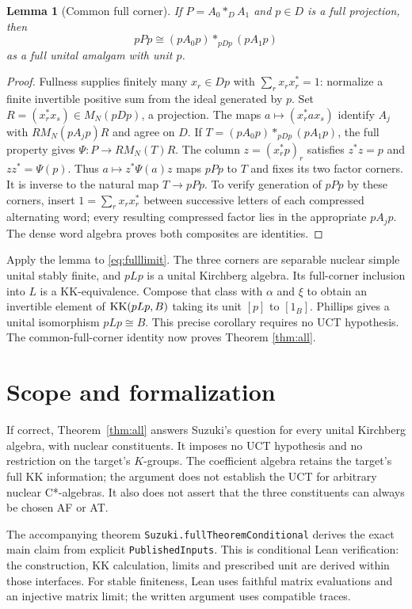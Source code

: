 \documentclass[11pt,letterpaper]{amsart}
\newtheorem{lemma}[theorem]{Lemma}
\theoremstyle{remark}\newtheorem{remark}[theorem]{Remark}
\begin{document}
\begin{lemma}[Common full corner]\label{lem:corner}
If $P=A_0*_D A_1$ and $p\in D$ is a full projection, then
\[
                    pPp\cong(pA_0p)*_{pDp}(pA_1p)
\]
as a full unital amalgam with unit $p$.
\end{lemma}
\begin{proof}
Fullness supplies finitely many $x_r\in Dp$ with
$\sum_rx_rx_r^*=1$: normalize a finite invertible positive sum from the
ideal generated by $p$. Set $R=(x_r^*x_s)\in M_N(pDp)$, a projection.
The maps $a\mapsto(x_r^*ax_s)$ identify $A_j$ with
$RM_N(pA_jp)R$ and agree on $D$. If $T=(pA_0p)*_{pDp}(pA_1p)$,
the full property gives $\Psi:P\to RM_N(T)R$. The column
$z=(x_r^*p)_r$ satisfies $z^*z=p$ and $zz^*=\Psi(p)$.
Thus $a\mapsto z^*\Psi(a)z$ maps $pPp$ to $T$ and fixes its two factor
corners. It is inverse to the natural map $T\to pPp$. To verify
generation of $pPp$ by these corners, insert
$1=\sum_rx_rx_r^*$ between successive letters of each compressed
alternating word; every resulting compressed factor lies in the
appropriate $pA_jp$. The dense word algebra proves both composites are
identities.
\end{proof}

Apply the lemma to \eqref{eq:fulllimit}. The three corners are separable
nuclear simple unital stably finite, and $pLp$ is a unital Kirchberg
algebra. Its full-corner inclusion into $L$ is a KK-equivalence. Compose
that class with $\alpha$ and $\xi$ to obtain an invertible element of
$\operatorname{KK}(pLp,B)$ taking its unit $[p]$ to $[1_B]$.
Phillips \cite[Corollary 4.2.2]{Phillips} gives a unital isomorphism
$pLp\cong B$. This precise corollary requires no UCT hypothesis.
The common-full-corner identity now proves Theorem \ref{thm:all}.

\section{Scope and formalization}
If correct, Theorem~\ref{thm:all} answers Suzuki's question for every
unital Kirchberg algebra, with nuclear constituents. It imposes no UCT
hypothesis and no restriction on the target's $K$-groups. The coefficient
algebra retains the target's full KK information; the argument does not
establish the UCT for arbitrary nuclear C*-algebras. It also does not
assert that the three constituents can always be chosen AF or AT.

The accompanying theorem \texttt{Suzuki.fullTheoremConditional} derives
the exact main claim from explicit \texttt{PublishedInputs}. This is
conditional Lean verification: the construction, KK calculation, limits
and prescribed unit are derived within those interfaces. For stable
finiteness, Lean uses faithful matrix evaluations and an injective matrix
limit; the written argument uses compatible traces.
\end{document}
